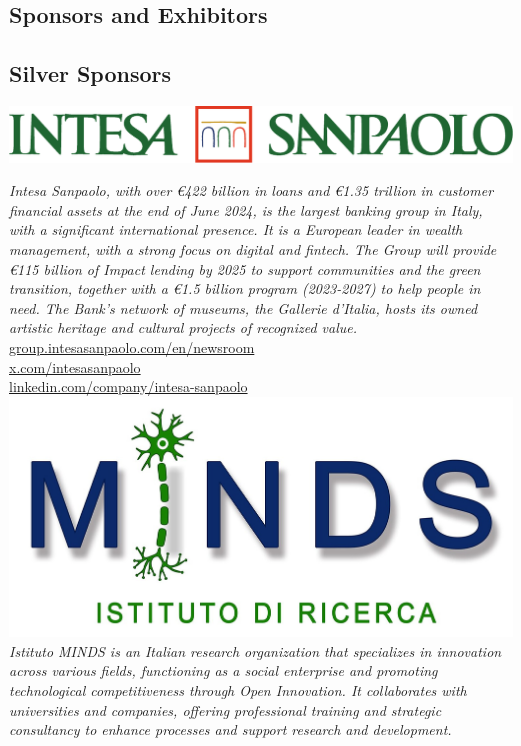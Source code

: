 \documentclass[
	openany, %
	parskip=full, %
	12pt, %
	a4paper, %
]{conferencebooklet} %
\begin{document}
\begin{multicols*}{2}
    \section{Sponsors and Exhibitors}
    
    \subsection{Silver Sponsors}    \hfill\includegraphics[width=\sponsorscaling\linewidth]{logos/intesa.pdf}\hspace*{\fill} 
    
    \textit{Intesa Sanpaolo, with over €422 billion in loans and €1.35 trillion in customer financial assets at the end of June 2024, is the largest banking group in Italy, with a significant international presence. It is a European leader in wealth management, with a strong focus on digital and fintech. The Group will provide €115 billion of Impact lending by 2025 to support communities and the green transition, together with a €1.5 billion program (2023-2027) to help people in need. The Bank's network of museums, the Gallerie d'Italia, hosts its owned artistic heritage and cultural projects of recognized value.} \\
    \url{group.intesasanpaolo.com/en/newsroom} \\ 
    \url{x.com/intesasanpaolo} \\
    \url{linkedin.com/company/intesa-sanpaolo} \\
    
    \hfill\includegraphics[width=\sponsorscaling\linewidth]{logos/minds.jpg}\hspace*{\fill}
    \vspace{2mm} \\
    \textit{Istituto MINDS is an Italian research organization that specializes in innovation across various fields, functioning as a social enterprise and promoting technological competitiveness through Open Innovation. It collaborates with universities and companies, offering professional training and strategic consultancy to enhance processes and support research and development.}
    

\end{multicols*}
\end{document}
